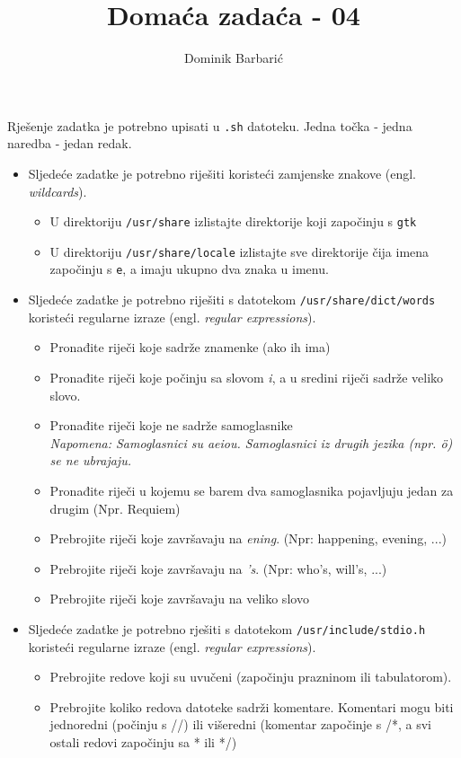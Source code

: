 \documentclass[12pt,a4paper]{article}
\newcommand{\shell}[1]{\texttt{#1}}
\begin{document}
	\title{Domaća zadaća - 04}
	\author{Dominik Barbarić}
	\maketitle
	Rješenje zadatka je potrebno upisati u \shell{.sh} datoteku. Jedna točka - jedna naredba - jedan redak.\\
	
	\begin{itemize}
	\item Sljedeće zadatke je potrebno riješiti koristeći zamjenske znakove (engl. \emph{wildcards}).
	\begin{itemize}	
		\item U direktoriju \shell{/usr/share} izlistajte direktorije koji započinju s \shell{gtk}
		\item U direktoriju \shell{/usr/share/locale} izlistajte sve direktorije čija imena započinju s \shell{e}, a imaju ukupno dva znaka u imenu.
	\end{itemize}
	
	\item Sljedeće zadatke je potrebno riješiti s datotekom \shell{/usr/share/dict/words} koristeći regularne izraze (engl. \emph{regular expressions}).
	\begin{itemize}
		\item Pronađite riječi koje sadrže znamenke (ako ih ima)
		\item Pronađite riječi koje počinju sa slovom \emph{i}, a u sredini riječi sadrže veliko slovo.
		\item Pronađite riječi koje ne sadrže samoglasnike \\ \emph{Napomena: Samoglasnici su aeiou. Samoglasnici iz drugih jezika (npr. ö) se ne ubrajaju.}
		\item Pronađite riječi u kojemu se barem dva samoglasnika pojavljuju jedan za drugim (Npr. Requiem)
		\item Prebrojite riječi koje završavaju na \emph{ening}. (Npr: happening, evening, ...)
		\item Prebrojite riječi koje završavaju na \emph{'s}. (Npr: who's, 	will's, ...)
		\item Prebrojite riječi koje završavaju na veliko slovo
	\end{itemize}
	
	\item Sljedeće zadatke je potrebno rješiti s datotekom \shell{/usr/include/stdio.h} koristeći regularne izraze (engl. \emph{regular expressions}).
	\begin{itemize}
		\item Prebrojite redove koji su uvučeni (započinju prazninom ili tabulatorom).
		\item Prebrojite koliko redova datoteke sadrži komentare. Komentari mogu biti jednoredni (počinju s //) ili višeredni (komentar započinje s /*, a svi ostali redovi započinju sa * ili */)
	\end{itemize}
	\end{itemize}
\end{document}

